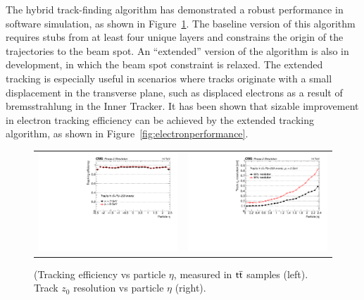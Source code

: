The hybrid track-finding algorithm has demonstrated a robust performance in software simulation, as shown in Figure~\ref{fig:trackingperformance}. The baseline version of this algorithm requires stubs from at least four unique layers and constrains the origin of the trajectories to the beam spot. An ``extended'' version of the algorithm is also in development, in which the beam spot constraint is relaxed. The extended tracking is especially useful in scenarios where tracks originate with a small displacement in the transverse plane, such as displaced electrons as a result of bremsstrahlung in the Inner Tracker. It has been shown that sizable improvement in electron tracking efficiency can be achieved by the extended tracking algorithm, as shown in Figure~\ref{fig:electronperformance}.

 \begin{figure}[tbh!]
 \begin{center}
 \begin{tabular}{cc}
  \includegraphics[width=.45\linewidth]{figures/Part2/Upgrade/L1TK_ttbar-pu200_eff_eta}&
  \includegraphics[width=.45\linewidth]{figures/Part2/Upgrade/L1TK_ttbar-pu200_resVsEta_z0}
 \end{tabular}
 \caption{(Tracking efficiency vs particle $\eta$, measured in $\textsf{t}\overline{\textsf{t}}$ samples (left). Track $z_0$ resolution vs particle $\eta$ (right).}
 \label{fig:trackingperformance}
 \end{center}
\end{figure} 

